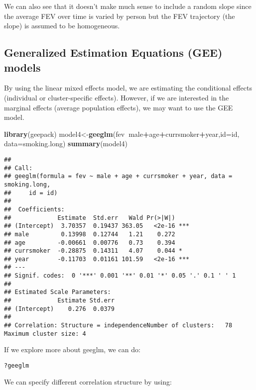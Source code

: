 \documentclass[]{book}
\newenvironment{Shaded}{\begin{snugshade}}{\end{snugshade}}
\newcommand{\KeywordTok}[1]{\textcolor[rgb]{0.13,0.29,0.53}{\textbf{#1}}}
\newcommand{\DataTypeTok}[1]{\textcolor[rgb]{0.13,0.29,0.53}{#1}}
\newcommand{\OperatorTok}[1]{\textcolor[rgb]{0.81,0.36,0.00}{\textbf{#1}}}
\newcommand{\NormalTok}[1]{#1}
\theoremstyle{definition}
\theoremstyle{definition}
\theoremstyle{definition}
\theoremstyle{remark}
\begin{document}
We can also see that it doesn't make much sense to include a random
slope since the average FEV over time is varied by person but the FEV
trajectory (the slope) is assumed to be homogeneous.

\subsection{Generalized Estimation Equations (GEE)
models}\label{generalized-estimation-equations-gee-models}

By using the linear mixed effects model, we are estimating the
conditional effects (individual or cluster-specific effects). However,
if we are interested in the marginal effects (average population
effects), we may want to use the GEE model.

\begin{Shaded}
\begin{Highlighting}[]
\KeywordTok{library}\NormalTok{(geepack)}
\NormalTok{model4<-}\KeywordTok{geeglm}\NormalTok{(fev}\OperatorTok{~}\NormalTok{male}\OperatorTok{+}\NormalTok{age}\OperatorTok{+}\NormalTok{currsmoker}\OperatorTok{+}\NormalTok{year,}\DataTypeTok{id=}\NormalTok{id, }\DataTypeTok{data=}\NormalTok{smoking.long)}
\KeywordTok{summary}\NormalTok{(model4)}
\end{Highlighting}
\end{Shaded}

\begin{verbatim}
## 
## Call:
## geeglm(formula = fev ~ male + age + currsmoker + year, data = smoking.long, 
##     id = id)
## 
##  Coefficients:
##             Estimate  Std.err   Wald Pr(>|W|)    
## (Intercept)  3.70357  0.19437 363.05   <2e-16 ***
## male         0.13998  0.12744   1.21    0.272    
## age         -0.00661  0.00776   0.73    0.394    
## currsmoker  -0.28875  0.14311   4.07    0.044 *  
## year        -0.11703  0.01161 101.59   <2e-16 ***
## ---
## Signif. codes:  0 '***' 0.001 '**' 0.01 '*' 0.05 '.' 0.1 ' ' 1
## 
## Estimated Scale Parameters:
##             Estimate Std.err
## (Intercept)    0.276  0.0379
## 
## Correlation: Structure = independenceNumber of clusters:   78   Maximum cluster size: 4
\end{verbatim}

If we explore more about geeglm, we can do:

\begin{verbatim}
?geeglm
\end{verbatim}

We can specify different correlation structure by using:
\end{document}
